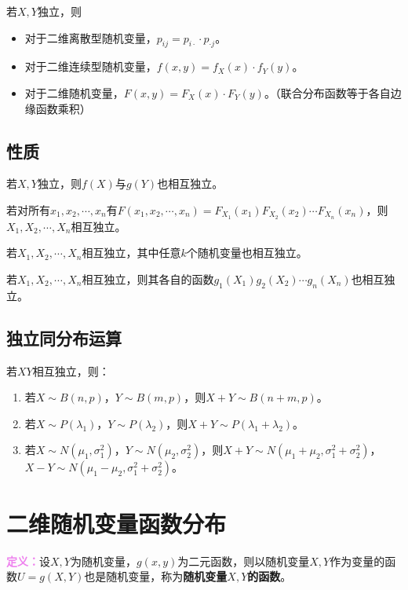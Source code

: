 \documentclass[UTF8, 12pt]{ctexart}
\begin{document}
若$X,Y$独立，则

\begin{itemize}
    \item 对于二维离散型随机变量，$p_{ij}=p_{i\cdot}\cdot p_{\cdot j}$。
    \item 对于二维连续型随机变量，$f(x,y)=f_X(x)\cdot f_Y(y)$。
    \item 对于二维随机变量，$F(x,y)=F_X(x)\cdot F_Y(y)$。（联合分布函数等于各自边缘函数乘积）
\end{itemize}

\subsection{性质}

若$X,Y$独立，则$f(X)$与$g(Y)$也相互独立。

若对所有$x_1,x_2,\cdots,x_n$有$F(x_1,x_2,\cdots,x_n)=F_{X_1}(x_1)F_{X_2}(x_2)\cdots F_{X_n}(x_n)$，则$X_1,X_2,\cdots,X_n$相互独立。

若$X_1,X_2,\cdots,X_n$相互独立，其中任意$k$个随机变量也相互独立。

若$X_1,X_2,\cdots,X_n$相互独立，则其各自的函数$g_1(X_1)g_2(X_2)\cdots g_n(X_n)$也相互独立。

\subsection{独立同分布运算}

若$XY$相互独立，则：

\begin{enumerate}
    \item 若$X\sim B(n,p)$，$Y\sim B(m,p)$，则$X+Y\sim B(n+m,p)$。
    \item 若$X\sim P(\lambda_1)$，$Y\sim P(\lambda_2)$，则$X+Y\sim P(\lambda_1+\lambda_2)$。
    \item 若$X\sim N(\mu_1,\sigma_1^2)$，$Y\sim N(\mu_2,\sigma_2^2)$，则$X+Y\sim N(\mu_1+\mu_2,\sigma_1^2+\sigma_2^2)$，$X-Y\sim N(\mu_1-\mu_2,\sigma_1^2+\sigma_2^2)$。
\end{enumerate}

\section{二维随机变量函数分布}

\textcolor{violet}{\textbf{定义：}}设$X,Y$为随机变量，$g(x,y)$为二元函数，则以随机变量$X,Y$作为变量的函数$U=g(X,Y)$也是随机变量，称为\textbf{随机变量$X,Y$的函数}。
\end{document}
